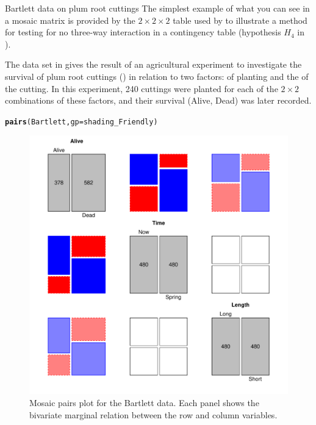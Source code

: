 \documentclass[11pt]{book}\usepackage[]{graphicx}\usepackage[]{color}
\makeatletter
\newcommand{\hlstd}[1]{\textcolor[rgb]{0.345,0.345,0.345}{#1}}%
\newcommand{\hlkwc}[1]{\textcolor[rgb]{0.333,0.667,0.333}{#1}}%
\newcommand{\hlkwd}[1]{\textcolor[rgb]{0.737,0.353,0.396}{\textbf{#1}}}%
\newenvironment{kframe}{%
 \def\at@end@of@kframe{}%
 \ifinner\ifhmode%
  \def\at@end@of@kframe{\end{minipage}}%
  \begin{minipage}{\columnwidth}%
 \fi\fi%
 \def\FrameCommand##1{\hskip\@totalleftmargin \hskip-\fboxsep
 \colorbox{shadecolor}{##1}\hskip-\fboxsep
     \hskip-\linewidth \hskip-\@totalleftmargin \hskip\columnwidth}%
 \MakeFramed {\advance\hsize-\width
   \@totalleftmargin\z@ \linewidth\hsize
   \@setminipage}}%
 {\par\unskip\endMakeFramed%
 \at@end@of@kframe}
\newenvironment{knitrout}{}{} %
\renewenvironment{knitrout}{\small\renewcommand{\baselinestretch}{.85}}{} %
\makeatother
\begin{document}
\begin{Example}[bartlett]{Bartlett data on plum root cuttings}
The simplest example of what you can see in a mosaic matrix is
provided by the $2 \times 2 \times 2$ table
used by \citet{Bartlett:35}
to illustrate a method for testing for no three-way interaction in a contingency table
(hypothesis $H_4$ in ).

The data set  in 
gives the result of an agricultural experiment to 
investigate the survival of plum root cuttings ()
in relation to two factors:  of planting and the  of the cutting.
In this experiment, 240 cuttings were planted for each of the $2 \times 2$ combinations of these factors, and their survival (Alive, Dead) was later recorded.

\begin{knitrout}
\color{fgcolor}\begin{kframe}
\begin{alltt}
\hlkwd{pairs}\hlstd{(Bartlett,} \hlkwc{gp}\hlstd{=shading_Friendly)}
\end{alltt}
\end{kframe}\begin{figure}[!htb]


\centerline{\includegraphics[width=.8\textwidth]{ch05/fig/bartlett-pairs} }

\caption[Mosaic pairs plot for the Bartlett data]{Mosaic pairs plot for the Bartlett data. Each panel shows the bivariate marginal relation between the row and column variables.\label{fig:bartlett-pairs}}
\end{figure}



\end{knitrout}
\end{Example}
\end{document}
